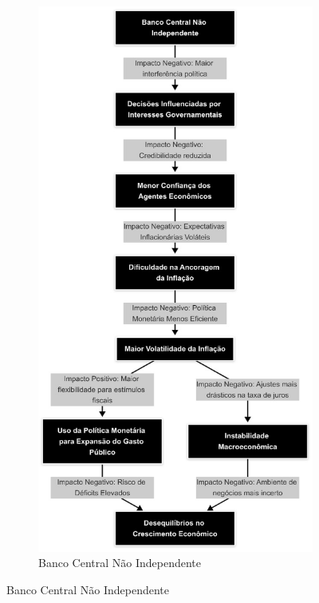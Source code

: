 \documentclass[a4paper,12pt]{article}
\begin{document}
\begin{figure}[H]
\begin{subfigure}[b]{0.45\textwidth}
        \label{fig:bc_independente}
    \end{subfigure}
    \hfill
    \begin{subfigure}[b]{0.45\textwidth}
        \centering
        \includegraphics[width=\linewidth]{Imagens/m2i2.jpg}
        \caption{Banco Central Não Independente}
        \label{fig:bc_nao_independente}
    \end{subfigure}
    \label{fig:comparacao_bc}
\end{figure}
\end{document}
